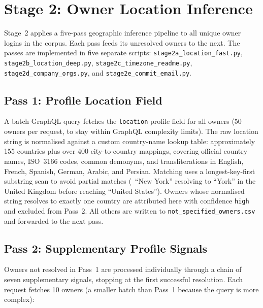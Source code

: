 \section{Stage 2: Owner Location Inference}
\label{sec:impl:geography}

Stage~2 applies a five-pass geographic inference pipeline to all unique owner logins in the corpus. Each pass feeds its unresolved owners to the next. The passes are implemented in five separate scripts: \texttt{stage2a\_location\_fast.py}, \texttt{stage2b\_location\_deep.py}, \texttt{stage2c\_timezone\_readme.py}, \texttt{stage2d\_company\_orgs.py}, and \texttt{stage2e\_commit\_email.py}.

\subsection{Pass 1: Profile Location Field}

A batch GraphQL query fetches the \texttt{location} profile field for all owners (50 owners per request, to stay within GraphQL complexity limits). The raw location string is normalised against a custom country-name lookup table: approximately 155 countries plus over 400 city-to-country mappings, covering official country names, ISO~3166 codes, common demonyms, and transliterations in English, French, Spanish, German, Arabic, and Persian. Matching uses a longest-key-first substring scan to avoid partial matches (\eg\ ``New York'' resolving to ``York'' in the United Kingdom before reaching ``United States''). Owners whose normalised string resolves to exactly one country are attributed here with confidence \texttt{high} and excluded from Pass~2. All others are written to \texttt{not\_specified\_owners.csv} and forwarded to the next pass.

\subsection{Pass 2: Supplementary Profile Signals}

Owners not resolved in Pass~1 are processed individually through a chain of seven supplementary signals, stopping at the first successful resolution. Each request fetches 10 owners (a smaller batch than Pass~1 because the query is more complex):

